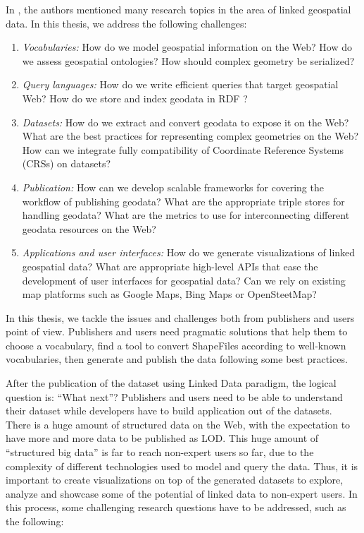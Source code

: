 In \cite{koubarakis12}, the authors mentioned many research topics in the area of linked geospatial data. In this thesis, we address the following challenges:

\begin{enumerate}

\item \textit{Vocabularies:} How do we model geospatial information on the Web? How do we assess geospatial ontologies? How should complex geometry be serialized? 
\item \textit{Query languages:} How do we write efficient queries that target geospatial Web? How do we store and index geodata in RDF ?
\item \textit{Datasets:} How do we extract and convert geodata to expose it on the Web? What are the best practices for representing complex geometries on the Web? How can we integrate fully compatibility of Coordinate Reference Systems (CRSs) on datasets? 
\item \textit{Publication:} How can we develop scalable frameworks for covering the workflow of publishing geodata? What are the appropriate triple stores for handling geodata? What are the metrics to use for interconnecting different geodata resources on the Web?  
\item \textit{Applications and user interfaces:} How do we generate visualizations of linked geospatial data? What are appropriate high-level APIs that ease the development of user interfaces for geospatial data? Can we rely on existing map platforms such as Google Maps, Bing Maps or OpenSteetMap?
\end{enumerate}

In this thesis, we tackle the issues and challenges both from publishers and users point of view. Publishers and users need pragmatic solutions that help them to choose a vocabulary, find a tool to convert ShapeFiles according to well-known vocabularies, then generate and publish the data following some best practices.


After the publication of the dataset using Linked Data paradigm, the logical question is: ``What next''? Publishers and users need to be able to understand their dataset while developers have to build application out of the datasets. There is a huge amount of structured data on the Web, with the expectation to have more and more 
data to be published as LOD. This huge amount of ``structured big data'' is far to reach non-expert users 
so far, due to the complexity of different technologies used to model and query the data. Thus, it is 
important to create visualizations on top of the generated datasets to explore, analyze and showcase 
some of the potential of linked data to non-expert users. In this process, some challenging research questions have to be addressed, such as the following:

